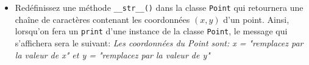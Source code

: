 \begin{Exercice}[15 minutes]
\begin{itemize}
        \item Redéfinissez une méthode \lstinline{__str__()} dans la classe \lstinline{Point} qui retournera une chaîne de caractères contenant les coordonnées $(x,y)$ d'un point. Ainsi, lorsqu'on fera un \lstinline{print} d'une instance de la classe \lstinline{Point}, le message qui s'affichera sera le suivant:
        \textit{Les coordonnées du Point sont: x = "remplacez par la valeur de x" et y = "remplacez par la valeur de y"}
    \end{itemize}

\end{Exercice}

\begin{solution}
    
\end{solution}


